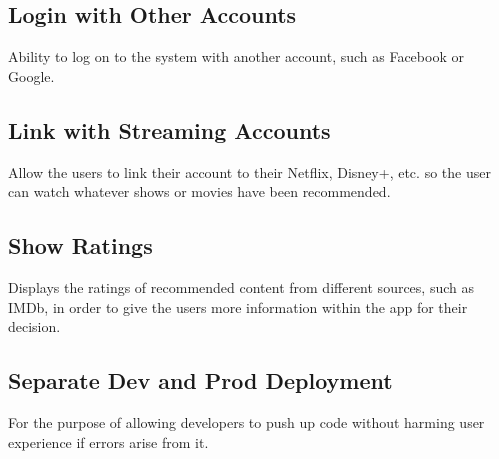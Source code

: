 \documentclass{article}
\begin{document}
\subsection{Login with Other Accounts}
Ability to log on to the system with another account, such as Facebook or Google.

\subsection{Link with Streaming Accounts}
Allow the users to link their account to their Netflix, Disney+, etc. so the user can watch whatever shows or movies have been recommended.

\subsection{Show Ratings}
Displays the ratings of recommended content from different sources, such as IMDb, in order to give the users more information within the app for their decision.

\subsection{Separate Dev and Prod Deployment}
For the purpose of allowing developers to push up code without harming user experience if errors arise from it.
\end{document}
